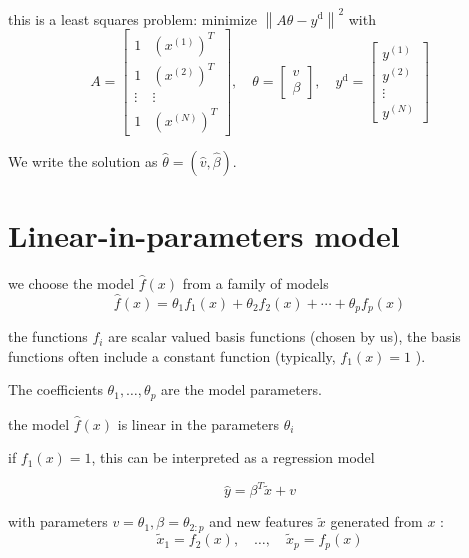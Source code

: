 this is a least squares problem: minimize $ \left\|A \theta-y^{\mathrm{d}}\right\|^{2} $ with
$$
A=\left[\begin{array}{cc}
1 & \left(x^{(1)}\right)^{T} \\
1 & \left(x^{(2)}\right)^{T} \\
\vdots & \vdots \\
1 & \left(x^{(N)}\right)^{T}
\end{array}\right], \quad \theta=\left[\begin{array}{c}
v \\
\beta
\end{array}\right], \quad y^{\mathrm{d}}=\left[\begin{array}{c}
y^{(1)} \\
y^{(2)} \\
\vdots \\
y^{(N)}
\end{array}\right]
$$

\begin{notation}
    We write the solution as $ \hat{\theta}=(\hat{v}, \hat{\beta}) $.
\end{notation}



\section{Linear-in-parameters model}

\begin{problem}
    we choose the model $ \hat{f}(x) $ from a family of models
$$
\hat{f}(x)=\theta_{1} f_{1}(x)+\theta_{2} f_{2}(x)+\cdots+\theta_{p} f_{p}(x)
$$

the functions $ f_{i} $ are scalar valued basis functions (chosen by us), the basis functions often include a constant function (typically, $ f_{1}(x)=1 $ ). 

The coefficients $ \theta_{1}, \ldots, \theta_{p} $ are the model parameters.
\end{problem}

the model $ \hat{f}(x) $ is linear in the parameters $ \theta_{i} $

\begin{corollary}
    if $ f_{1}(x)=1 $, this can be interpreted as a regression model

$$
\hat{y}=\beta^{T} \tilde{x}+v
$$
\end{corollary}


with parameters $ v=\theta_{1}, \beta=\theta_{2: p} $ and new features $ \tilde{x} $ generated from $ x $ :
$$
\tilde{x}_{1}=f_{2}(x), \quad \ldots, \quad \tilde{x}_{p}=f_{p}(x)
$$

